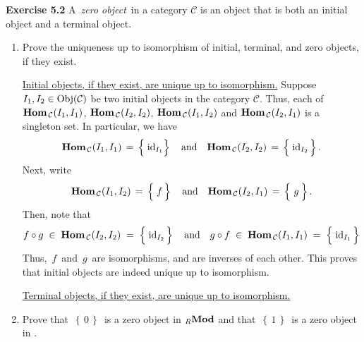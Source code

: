\vskip 0.5cm
\noindent
\textbf{Exercise 5.2}
\vskip 0.2cm
\noindent
A \,\textit{zero object}\, in a category $\mathcal{C}$ is an object that is both an initial object
and a terminal object.
\begin{enumerate}
\item
	Prove the uniqueness up to isomorphism of initial, terminal, and zero objects, if they exist.
	
	\proof
	\vskip 0.2cm
	\underline{Initial objects, if they exist, are unique up to isomorphism.}
	\vskip 0.0cm
	Suppose $I_{1}, I_{2} \in \textnormal{Obj}(\mathcal{C})$ be two initial objects in the category $\mathcal{C}$.
	Thus, each of $\textbf{Hom}_{\,\mathcal{C}}(I_{1},I_{1})$, $\textbf{Hom}_{\,\mathcal{C}}(I_{2},I_{2})$,
	$\textbf{Hom}_{\,\mathcal{C}}(I_{1},I_{2})$ and $\textbf{Hom}_{\,\mathcal{C}}(I_{2},I_{1})$ is a singleton set.
	In particular, we have
	\begin{equation*}
	\Hom_{\,\mathcal{C}}(I_{1},I_{1}) \,=\, \left\{\;\overset{{\color{white}.}}{\id}_{I_{1}}\right\}
	\quad\textnormal{and}\quad
	\Hom_{\,\mathcal{C}}(I_{2},I_{2}) \,=\, \left\{\;\overset{{\color{white}.}}{\id}_{I_{2}}\,\right\}.
	\end{equation*}
	Next, write
	\begin{equation*}
	\Hom_{\,\mathcal{C}}(I_{1},I_{2}) \,=\, \left\{\;\overset{{\color{white}.}}{f}\,\right\}
	\quad\textnormal{and}\quad
	\Hom_{\,\mathcal{C}}(I_{2},I_{1}) \,=\, \left\{\;\overset{{\color{white}-}}{g}\,\right\}.
	\end{equation*}
	Then, note that
	\begin{equation*}
	f \circ g \;\in\; \Hom_{\,\mathcal{C}}(I_{2},I_{2}) \;=\; \left\{\;\overset{{\color{white}.}}{\id}_{I_{2}}\,\right\}
	\quad\textnormal{and}\quad
	g \circ f \;\in\; \Hom_{\,\mathcal{C}}(I_{1},I_{1}) \;=\; \left\{\;\overset{{\color{white}.}}{\id}_{I_{1}}\,\right\}
	\end{equation*}
	Thus, \,$f$\, and \,$g$\, are isomorphisms, and are inverses of each other.
	This proves that initial objects are indeed unique up to isomorphism.

	\vskip 0.2cm
	\underline{Terminal objects, if they exist, are unique up to isomorphism.}
	\vskip 0.0cm

\item
	Prove that \,$\left\{\,0\,\right\}$\, is a zero object in $_{R}\textbf{Mod}$ and that
	\,$\left\{\,1\,\right\}$\, is a zero object in \Groups.
	
\end{enumerate}


\renewcommand{\theenumi}{\roman{enumi}}
\renewcommand{\labelenumi}{\textnormal{(\theenumi)}$\;\;$}


